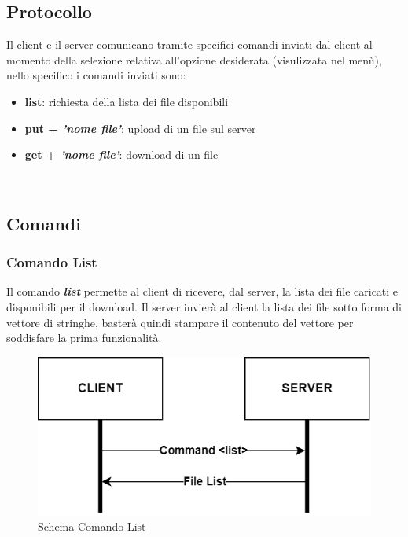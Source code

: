 \documentclass{article}
\begin{document}
\subsection{Protocollo}

Il client e il server comunicano tramite specifici comandi inviati dal client al momento della selezione relativa all'opzione desiderata (visulizzata nel menù), nello specifico i comandi inviati sono:
\begin{itemize}
    \item \textbf{list}: richiesta della lista dei file disponibili
    \item \textbf{put + \textit{'nome file'}}: upload di un file sul server
    \item \textbf{get + \textit{'nome file'}}: download di un file
\end{itemize}

\ \\

\subsection{Comandi}
\subsubsection{Comando List}


Il comando \textbf{\emph{list}} permette al client di ricevere, dal server, la lista dei file caricati e disponibili per il download.
Il server invierà al client la lista dei file sotto forma di vettore di stringhe, basterà quindi stampare il contenuto del vettore per soddisfare la prima funzionalità.

\begin{figure}[!htb]
  \includegraphics[width=\linewidth]{commandList.png}
  \caption{Schema Comando List}
\end{figure}
\end{document}
